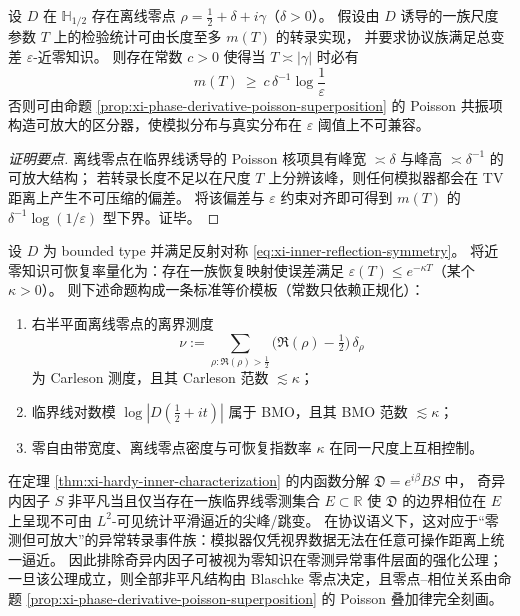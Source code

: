 \begin{proposition}\label{prop:xi-offcritical-zero-forces-transcript-length}
设 \(D\) 在 \(\mathbb{H}_{1/2}\) 存在离线零点 \(\rho=\tfrac12+\delta+i\gamma\)（\(\delta>0\)）。
假设由 \(D\) 诱导的一族尺度参数 \(T\) 上的检验统计可由长度至多 \(m(T)\) 的转录实现，
并要求协议族满足总变差 \(\varepsilon\)-近零知识。
则存在常数 \(c>0\) 使得当 \(T\asymp|\gamma|\) 时必有
\[
\boxed{\;
m(T)\ \ge\ c\,\delta^{-1}\log\!\frac{1}{\varepsilon}\;}
\]
否则可由命题 \ref{prop:xi-phase-derivative-poisson-superposition} 的 Poisson 共振项构造可放大的区分器，使模拟分布与真实分布在 \(\varepsilon\) 阈值上不可兼容。
\end{proposition}
\begin{proof}[证明要点]
离线零点在临界线诱导的 Poisson 核项具有峰宽 \(\asymp\delta\) 与峰高 \(\asymp\delta^{-1}\) 的可放大结构；
若转录长度不足以在尺度 \(T\) 上分辨该峰，则任何模拟器都会在 TV 距离上产生不可压缩的偏差。
将该偏差与 \(\varepsilon\) 约束对齐即可得到 \(m(T)\) 的 \(\delta^{-1}\log(1/\varepsilon)\) 型下界。证毕。
\end{proof}

\begin{theorem}\label{thm:xi-carleson-bmo-recovery-template}
设 \(D\) 为 bounded type 并满足反射对称 \eqref{eq:xi-inner-reflection-symmetry}。
将近零知识可恢复率量化为：存在一族恢复映射使误差满足 \(\varepsilon(T)\le e^{-\kappa T}\)（某个 \(\kappa>0\)）。
则下述命题构成一条标准等价模板（常数只依赖正规化）：
\begin{enumerate}
  \item 右半平面离线零点的离界测度
  \[
  \nu:=\sum_{\rho:\Re(\rho)>\frac12}\bigl(\Re(\rho)-\tfrac12\bigr)\,\delta_{\rho}
  \]
  为 Carleson 测度，且其 Carleson 范数 \(\lesssim \kappa\)；
  \item 临界线对数模 \(\log|D(\tfrac12+it)|\) 属于 BMO，且其 BMO 范数 \(\lesssim \kappa\)；
  \item 零自由带宽度、离线零点密度与可恢复指数率 \(\kappa\) 在同一尺度上互相控制。
\end{enumerate}
\end{theorem}

\begin{remark}\label{rem:xi-singular-inner-factor-information-spikes}
在定理 \ref{thm:xi-hardy-inner-characterization} 的内函数分解 \(\mathfrak{D}=e^{i\beta}BS\) 中，
奇异内因子 \(S\) 非平凡当且仅当存在一族临界线零测集合 \(E\subset\mathbb{R}\) 使 \(\mathfrak{D}\) 的边界相位在 \(E\) 上呈现不可由 \(L^2\)-可见统计平滑逼近的尖峰/跳变。
在协议语义下，这对应于“零测但可放大”的异常转录事件族：模拟器仅凭视界数据无法在任意可操作距离上统一逼近。
因此排除奇异内因子可被视为零知识在零测异常事件层面的强化公理；一旦该公理成立，则全部非平凡结构由 Blaschke 零点决定，且零点–相位关系由命题 \ref{prop:xi-phase-derivative-poisson-superposition} 的 Poisson 叠加律完全刻画。
\end{remark}

